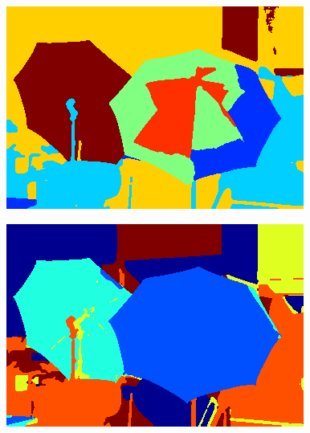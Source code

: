 \documentclass[a0,landscape]{a0poster}
\begin{document}
\begin{multicols}{4}
{ \centering
  \begin{minipage}{0.45\columnwidth}
    \centering
    \includegraphics[width=\textwidth]{./Images/Umbrella/specClust.png}%
  \end{minipage}\hfill %
  \begin{minipage}{0.45\columnwidth}
    \centering
    \includegraphics[width=\textwidth]{./Images/Umbrella/MBO.png}
  \end{minipage}
  \label{fig:DFCfig2}
}


\end{multicols}
\end{document}
